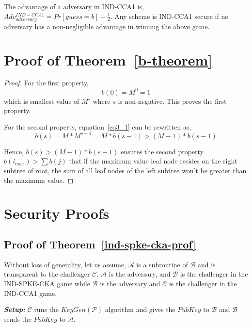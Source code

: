 \documentclass[sigconf,pdftex]{acmart}
\begin{document}
 
 The advantage of a adversary in IND-CCA1 is, 
 $Adv_{adversary}^{IND-CCA1} = Pr[guess = b]-\frac{1}{2}$.
 Any scheme is IND-CCA1 secure if no adversary has a non-negligible advantage in winning the above game.
 
 \section{Proof of Theorem~\ref{b-theorem}}
 \label{b-proof}
 \begin{proof}

For the first property,
\begin{equation} 
b(0) = M^0 = 1
\end{equation}
which is smallest value of $M^s$ where $s$ is non-negative. This proves the first property.
 
For the second property, equation~\ref{eq3_1} can be rewritten as, 
\begin{equation} 
\label{eq3}
 b(s) = M * M^{s-1} 
  = M * b(s-1) 
  > (M-1) * b(s-1) 
\end{equation}

Hence, $b(s) > (M-1) * b(s-1)$ ensures the second property $b(i_{max}) > \sum b(j)$ that if the maximum value leaf node resides on the right subtree of root, the sum of all leaf nodes of the left subtree won’t be greater than the maximum value.
\end{proof}
 
\section{Security Proofs}

\subsection{Proof of Theorem~\ref{ind-spke-cka-prof}}\label{app-ind-spke-cka-prof}

 
Without loss of generality, let us assume, $\mathcal{A}$ is a subroutine of $\mathcal{B}$ and is transparent to the challenger $\mathcal{C}$. $\mathcal{A}$ is the adversary, and $\mathcal{B}$ is the challenger in the IND-SPKE-CKA game while $\mathcal{B}$ is the adversary and $\mathcal{C}$ is the challenger in the IND-CCA1 game.

\textbf{\textit{Setup:}} $\mathcal{C}$ runs the $KeyGen(\mathcal{P})$ algorithm and gives the $PubKey$ to $\mathcal{B}$ and $\mathcal{B}$ sends the $PubKey$ to $\mathcal{A}$. 
\end{document}
